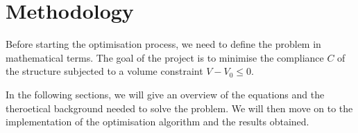 \section{Methodology}
\label{sec:methodology}

Before starting the optimisation process, we need to define the problem in mathematical terms.
The goal of the project is to minimise the compliance $C$ of the structure subjected to a volume constraint $V - V_0 \le 0$.

In the following sections, we will give an overview of the equations and the theroetical background needed to solve the problem.
We will then move on to the implementation of the optimisation algorithm and the results obtained.